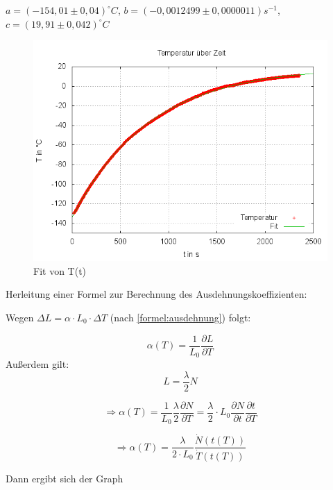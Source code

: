 $a = (-154,01 \pm 0,04)^{\circ}C$,
$b=(-0,0012499 \pm 0,0000011)s^{-1}$,
$c=(19,91 \pm 0,042)^{\circ}C$ \\


\begin{figure}
\centering
        \includegraphics[width=.8\textwidth]{images/Fit_T(t).png}
\caption{Fit von T(t)}
\label{Fit T(t)}
\end{figure}


Herleitung einer Formel zur Berechnung des Ausdehnungskoeffizienten:

Wegen $ \Delta L = \alpha \cdot L_{0} \cdot \Delta T $  (nach \eqref{formel:ausdehnung}) folgt: 

\begin{equation}
\alpha (T) = \frac{1}{L_{0}} \frac{\partial L}{\partial T}
\end{equation}
Außerdem gilt: 
\begin{equation}
L = \frac{\lambda}{2} N
\end{equation}

\begin{equation}
\Rightarrow \alpha(T) = \frac{1}{L_{0}} \frac{\lambda}{2} \frac{\partial N}{\partial T} = \frac{\lambda}{2} \cdot L_{0} \frac{\partial N}{\partial t} \frac{\partial t}{\partial T}
\end{equation}

\begin{equation}
\Rightarrow \alpha (T) = \frac{\lambda}{2 \cdot L_{0}} \frac{\dot{N}(t(T))}{\dot{T}(t(T))}
\end{equation}  

Dann ergibt sich der Graph 


